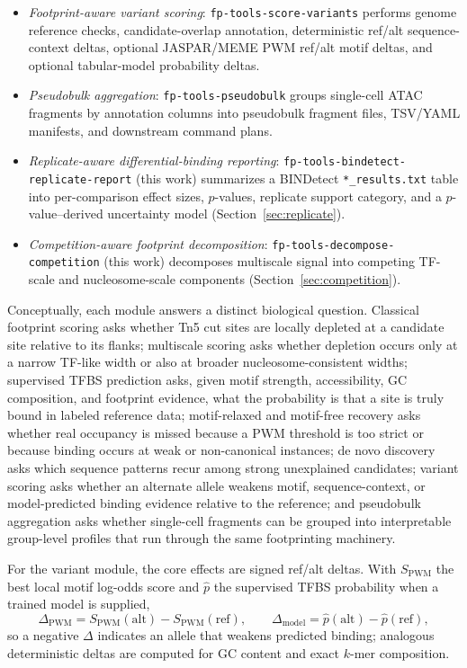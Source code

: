 \documentclass[biomedinformatics,article,submit,pdftex,moreauthors]{Definitions/mdpi}
\begin{document}
\begin{itemize}
  \item \emph{Footprint-aware variant scoring}: \texttt{fp-tools-score-variants}
        performs genome reference checks, candidate-overlap annotation,
        deterministic ref/alt sequence-context deltas, optional JASPAR/MEME PWM
        ref/alt motif deltas, and optional tabular-model probability deltas.
  \item \emph{Pseudobulk aggregation}: \texttt{fp-tools-pseudobulk} groups
        single-cell ATAC fragments by annotation columns into pseudobulk fragment
        files, TSV/YAML manifests, and downstream command plans.
  \item \emph{Replicate-aware differential-binding reporting}:
        \texttt{fp-tools-bindetect-replicate-report} (this work) summarizes a
        BINDetect \texttt{*\_results.txt} table into per-comparison effect sizes,
        $p$-values, replicate support category, and a $p$-value--derived
        uncertainty model (Section~\ref{sec:replicate}).
  \item \emph{Competition-aware footprint decomposition}:
        \texttt{fp-tools-decompose-competition} (this work) decomposes multiscale
        signal into competing TF-scale and nucleosome-scale components
        (Section~\ref{sec:competition}).
\end{itemize}

Conceptually, each module answers a distinct biological question. Classical
footprint scoring asks whether Tn5 cut sites are locally depleted at a candidate
site relative to its flanks; multiscale scoring asks whether depletion occurs only
at a narrow TF-like width or also at broader nucleosome-consistent widths;
supervised TFBS prediction asks, given motif strength, accessibility, GC
composition, and footprint evidence, what the probability is that a site is truly
bound in labeled reference data; motif-relaxed and motif-free recovery asks whether
real occupancy is missed because a PWM threshold is too strict or because binding
occurs at weak or non-canonical instances; de novo discovery asks which sequence
patterns recur among strong unexplained candidates; variant scoring asks whether an
alternate allele weakens motif, sequence-context, or model-predicted binding
evidence relative to the reference; and pseudobulk aggregation asks whether
single-cell fragments can be grouped into interpretable group-level profiles that
run through the same footprinting machinery.

For the variant module, the core effects are signed ref/alt deltas. With $S_{\mathrm{PWM}}$
the best local motif log-odds score and $\hat{p}$ the supervised TFBS probability
when a trained model is supplied,
\[
\Delta_{\mathrm{PWM}} = S_{\mathrm{PWM}}(\mathrm{alt})-S_{\mathrm{PWM}}(\mathrm{ref}),
\qquad
\Delta_{\mathrm{model}} = \hat{p}(\mathrm{alt})-\hat{p}(\mathrm{ref}),
\]
so a negative $\Delta$ indicates an allele that weakens predicted binding; analogous
deterministic deltas are computed for GC content and exact $k$-mer composition.
\end{document}
